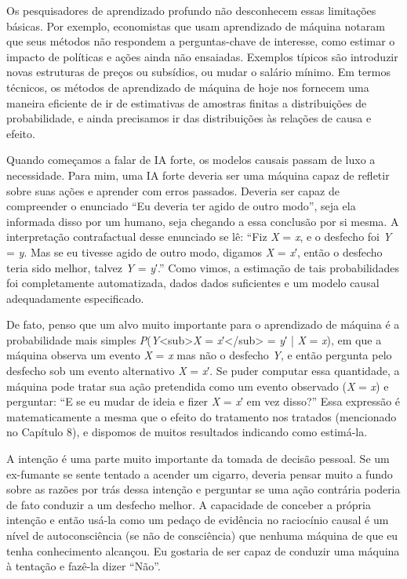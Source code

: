\documentclass[11pt,a5paper,twoside]{book}
\begin{document}
Os pesquisadores de aprendizado profundo não desconhecem essas limitações básicas. Por exemplo, economistas que usam aprendizado de máquina notaram que seus métodos não respondem a perguntas-chave de interesse, como estimar o impacto de políticas e ações ainda não ensaiadas. Exemplos típicos são introduzir novas estruturas de preços ou subsídios, ou mudar o salário mínimo. Em termos técnicos, os métodos de aprendizado de máquina de hoje nos fornecem uma maneira eficiente de ir de estimativas de amostras finitas a distribuições de probabilidade, e ainda precisamos ir das distribuições às relações de causa e efeito.

Quando começamos a falar de IA forte, os modelos causais passam de luxo a necessidade. Para mim, uma IA forte deveria ser uma máquina capaz de refletir sobre suas ações e aprender com erros passados. Deveria ser capaz de compreender o enunciado “Eu deveria ter agido de outro modo”, seja ela informada disso por um humano, seja chegando a essa conclusão por si mesma. A interpretação contrafactual desse enunciado se lê: “Fiz \textit{X} = \textit{x}, e o desfecho foi \textit{Y} = \textit{y}. Mas se eu tivesse agido de outro modo, digamos \textit{X} = \textit{x}′, então o desfecho teria sido melhor, talvez \textit{Y} = \textit{y}′.” Como vimos, a estimação de tais probabilidades foi completamente automatizada, dados dados suficientes e um modelo causal adequadamente especificado.

De fato, penso que um alvo muito importante para o aprendizado de máquina é a probabilidade mais simples \textit{P}(\textit{Y}<sub>\textit{X} = \textit{x}′</sub> = \textit{y}′ | \textit{X} = \textit{x}), em que a máquina observa um evento \textit{X} = \textit{x} mas não o desfecho \textit{Y}, e então pergunta pelo desfecho sob um evento alternativo \textit{X} = \textit{x}′. Se puder computar essa quantidade, a máquina pode tratar sua ação pretendida como um evento observado (\textit{X} = \textit{x}) e perguntar: “E se eu mudar de ideia e fizer \textit{X} = \textit{x}′ em vez disso?” Essa expressão é matematicamente a mesma que o efeito do tratamento nos tratados (mencionado no Capítulo 8), e dispomos de muitos resultados indicando como estimá-la.

A intenção é uma parte muito importante da tomada de decisão pessoal. Se um ex-fumante se sente tentado a acender um cigarro, deveria pensar muito a fundo sobre as razões por trás dessa intenção e perguntar se uma ação contrária poderia de fato conduzir a um desfecho melhor. A capacidade de conceber a própria intenção e então usá-la como um pedaço de evidência no raciocínio causal é um nível de autoconsciência (se não de consciência) que nenhuma máquina de que eu tenha conhecimento alcançou. Eu gostaria de ser capaz de conduzir uma máquina à tentação e fazê-la dizer “Não”.
\end{document}
